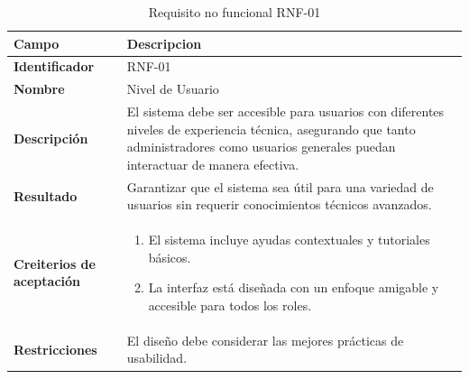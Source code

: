 \begin{table}[htb!]
    \centering
\caption{Requisito no funcional RNF-01}
    \begin{tabular}{|p{3cm}|p{12cm}|}
    \hline
    \textbf{Campo} & \textbf{Descripcion} \\ \hline
    \textbf{Identificador} & RNF-01 \\ \hline
    \textbf{Nombre} &  Nivel de Usuario \\ \hline
    \textbf{Descripción} &  El sistema debe ser accesible para usuarios con diferentes niveles de experiencia técnica, asegurando que tanto administradores como usuarios generales puedan interactuar de manera efectiva. \\ \hline
    \textbf{Resultado} &  Garantizar que el sistema sea útil para una variedad de usuarios sin requerir conocimientos técnicos avanzados. \\ \hline
    \textbf{Creiterios de aceptación} & 
    \begin{enumerate}
        \item El sistema incluye ayudas contextuales y tutoriales básicos.
        \item La interfaz está diseñada con un enfoque amigable y accesible para todos los roles.
        
    \end{enumerate}
    \\ \hline
    \textbf{Restricciones} & El diseño debe considerar las mejores prácticas de usabilidad. \\ \hline
    
\end{tabular}
\end{table}
\FloatBarrier

